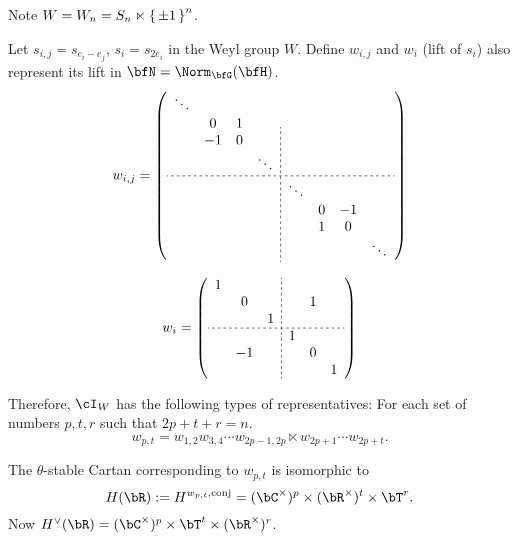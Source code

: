 \documentclass[12pt,a4paper]{amsart}
\numberwithin{equation}{section}
\theoremstyle{remark}
\begin{document}
Note $W = W_n = S_n\ltimes \set{\pm 1}^n$.


Let $s_{i,j} = s_{e_i -e_j}$, $s_i = s_{2e_i}$ in the Weyl group $W$.  Define $w_{i,j}$ and $w_{i}$ (lift of $s_i$) also represent its lift in
$\bfN = \Norm_{\bfG}(\bfH)$.
\[
  w_{i,j}=
  \left(
    \begin{array}{cccc;{2pt/2pt}cccc}
      \ddots &    &   &        &        &    &   &        \\
             & 0  & 1 &        &        &    &   &        \\
             & -1 & 0 &        &        &    &   &        \\
             &    &   & \ddots &        &    &   &        \\
      \hdashline[2pt/2pt]
             &    &   &        & \ddots &    &   &        \\
             &    &   &        &        & 0  & -1          \\
             &    &   &        &        & 1 & 0 &        \\
             &    &   &        &        &    &   & \ddots \\
    \end{array} 
  \right)
\]

\[
  w_{i}=
  \left(
    \begin{array}{ccc;{2pt/2pt}ccc}
        1   &   &    &    &        &           \\
            & 0   &  &      &      1  &           \\
            &   & 1  &    &        &           \\
      \hdashline[2pt/2pt]
            &   &    &  1 &        &           \\
            &  -1  &  &      &      0  &           \\
            &   &    &    &        & 1         \\
    \end{array} 
  \right)
\]

Therefore, $\cI_W$ has the following types of representatives: For each set of
numbers $p,t, r$ such that $2p+t+r =n$.
\[
  w_{p,t}= w_{1,2}w_{3,4}\cdots w_{2p-1,2p}\ltimes  w_{2p+1}\cdots w_{2p+t}.
\]

The $\theta$-stable Cartan corresponding to $w_{p,t}$ is isomorphic to
\[
  H(\bR):=H^{w_{p,t}, \mathrm{conj}}= (\bC^\times )^p\times (\bR^\times)^t\times \bT^r.
\]
Now $H^\vee(\bR) = (\bC^\times)^p \times \bT^t\times (\bR^\times)^r$. 
\end{document}
